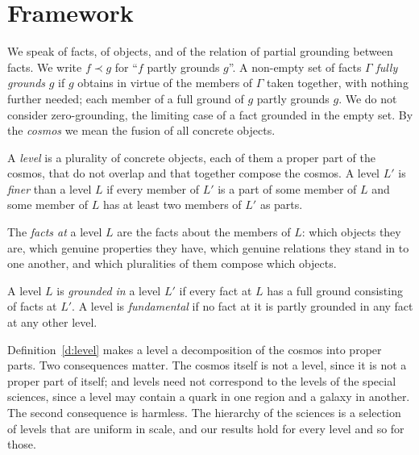 \documentclass{situationist-preprint}
\begin{document}
\section{Framework}\label{s:framework}

We speak of facts, of objects, and of the relation of partial grounding between facts. We write $f \prec g$ for \enquote{$f$ partly grounds $g$}. A non-empty set of facts $\Gamma$ \emph{fully grounds} $g$ if $g$ obtains in virtue of the members of $\Gamma$ taken together, with nothing further needed; each member of a full ground of $g$ partly grounds $g$. We do not consider zero-grounding, the limiting case of a fact grounded in the empty set. By the \emph{cosmos} we mean the fusion of all concrete objects.

\begin{definition}[Level]\label{d:level}
A \emph{level} is a plurality of concrete objects, each of them a proper part of the cosmos, that do not overlap and that together compose the cosmos. A level $L'$ is \emph{finer} than a level $L$ if every member of $L'$ is a part of some member of $L$ and some member of $L$ has at least two members of $L'$ as parts.
\end{definition}

\begin{definition}\label{d:facts}
The \emph{facts at} a level $L$ are the facts about the members of $L$: which objects they are, which genuine properties they have, which genuine relations they stand in to one another, and which pluralities of them compose which objects.
\end{definition}

\begin{definition}\label{d:grounded}
A level $L$ is \emph{grounded in} a level $L'$ if every fact at $L$ has a full ground consisting of facts at $L'$. A level is \emph{fundamental} if no fact at it is partly grounded in any fact at any other level.
\end{definition}

Definition~\ref{d:level} makes a level a decomposition of the cosmos into proper parts. Two consequences matter. The cosmos itself is not a level, since it is not a proper part of itself; and levels need not correspond to the levels of the special sciences, since a level may contain a quark in one region and a galaxy in another. The second consequence is harmless. The hierarchy of the sciences is a selection of levels that are uniform in scale, and our results hold for every level and so for those.
\end{document}
